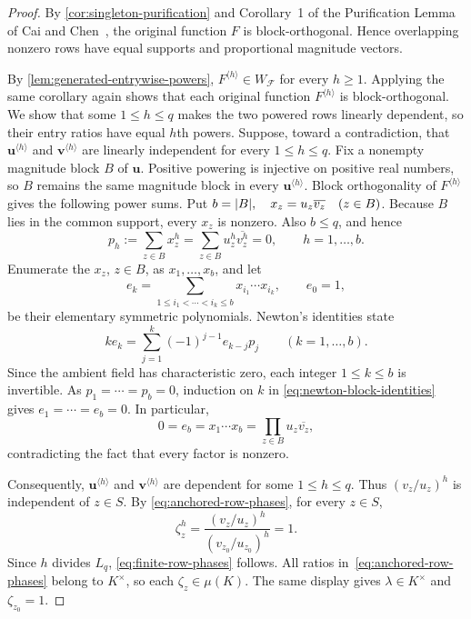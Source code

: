 \documentclass[11pt,letterpaper,onecolumn]{article}
\theoremstyle{plain}
\theoremstyle{definition}
\theoremstyle{remark}
\newcommand{\cF}{\mathcal F}
\newcommand{\Pow}[2]{#1^{\langle #2\rangle}}
\DeclarePairedDelimiter{\abs}{\lvert}{\rvert}
\begin{document}
\begin{proof}
By \cref{cor:singleton-purification} and Corollary~1 of the Purification Lemma
of Cai and Chen~\cite[Lemma~7 and Corollary~1]{CaiChen2017}, the original
function $F$ is block-orthogonal.
Hence overlapping nonzero rows have equal
supports and proportional magnitude vectors.

By \cref{lem:generated-entrywise-powers}, $\Pow{F}{h}\in W_{\cF}$ for every
$h\ge1$.  Applying the same corollary again shows that each original function
$\Pow{F}{h}$ is block-orthogonal.  We show that some $1\le h\le q$ makes
the two powered rows linearly dependent, so their entry ratios have equal
$h$th powers.  Suppose, toward a contradiction, that
$\Pow{\mathbf u}{h}$ and $\Pow{\mathbf v}{h}$ are linearly independent
for every $1\le h\le q$.  Fix a nonempty magnitude block $B$ of $\mathbf u$.
Positive powering is injective on positive real numbers, so $B$ remains the
same magnitude block in every $\Pow{\mathbf u}{h}$.  Block orthogonality of
$\Pow{F}{h}$ gives the following power sums.  Put $b=\abs B, \quad x_z=u_z\overline{v_z}\quad(z\in B)$. Because $B$ lies in the common support, every $x_z$ is nonzero.  Also
$b\le q$, and hence
\begin{equation*}
  p_h:=\sum_{z\in B}x_z^h
  =\sum_{z\in B}u_z^h\overline{v_z^h}=0,
  \qquad h=1,\ldots,b.
\end{equation*}
Enumerate the $x_z$, $z\in B$, as $x_1,\ldots,x_b$, and let
\[
  e_k=\sum_{1\le i_1<\cdots<i_k\le b}
       x_{i_1}\cdots x_{i_k},
  \qquad e_0=1,
\]
be their elementary symmetric polynomials.  Newton's identities state
\begin{equation}
  k e_k
  =\sum_{j=1}^k(-1)^{j-1}e_{k-j}p_j
  \qquad(k=1,\ldots,b).
  \label{eq:newton-block-identities}
\end{equation}
Since the ambient field has characteristic zero, each integer
$1\le k\le b$ is invertible.  As $p_1=\cdots=p_b=0$, induction on $k$ in
\eqref{eq:newton-block-identities} gives
$e_1=\cdots=e_b=0$.  In particular,
\[
  0=e_b=x_1\cdots x_b
  =\prod_{z\in B}u_z\overline{v_z},
\]
contradicting the fact that every factor is nonzero.

Consequently, $\Pow{\mathbf u}{h}$ and $\Pow{\mathbf v}{h}$ are dependent
for some $1\le h\le q$.  Thus $(v_z/u_z)^h$ is independent of $z\in S$.  By
\eqref{eq:anchored-row-phases}, for every $z\in S$,
\[
  \zeta_z^h
  =\frac{(v_z/u_z)^h}{(v_{z_0}/u_{z_0})^h}=1.
\]
Since $h$ divides $L_q$, \eqref{eq:finite-row-phases} follows.  All ratios
in~\eqref{eq:anchored-row-phases} belong to $K^\times$, so each
$\zeta_z\in\mu(K)$. The same display gives
$\lambda\in K^\times$ and $\zeta_{z_0}=1$.
\end{proof}
\end{document}
